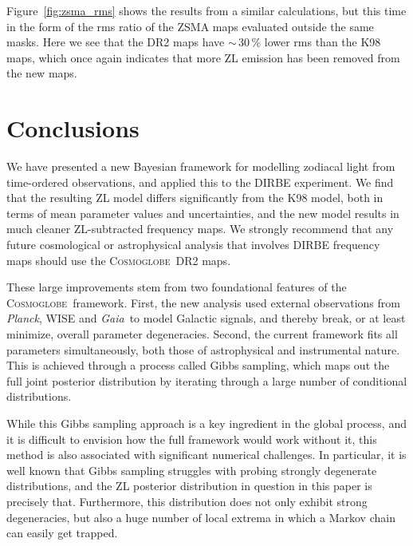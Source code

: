 \documentclass[twocolumn]{aa}
\def\Planck{\textit{Planck}}
\def\GAIA{\textit{Gaia}}
\newcommand{\cosmoglobe}{\textsc{Cosmoglobe}}
\begin{document}
Figure~\ref{fig:zsma_rms} shows the results from a similar
calculations, but this time in the form of the rms ratio of the ZSMA
maps evaluated outside the same masks. Here we see that the DR2 maps
have $\sim$\,30\,\% lower rms than the K98 maps, which once
again indicates that more ZL emission has been removed from the
new maps.









\section{Conclusions}
\label{sec:conclusions}

We have presented a new Bayesian framework for modelling zodiacal
light from time-ordered observations, and applied this to the
DIRBE experiment. We find that the resulting ZL model differs
significantly from the K98 model, both in terms of mean parameter
values and uncertainties, and the new model results in much cleaner
ZL-subtracted frequency maps. We strongly recommend that any future
cosmological or astrophysical analysis that involves DIRBE frequency
maps should use the \cosmoglobe\ DR2 maps.

These large improvements stem from two foundational features of the
\cosmoglobe\ framework. First, the new analysis used external
observations from \Planck, WISE and \GAIA\ to model Galactic signals,
and thereby break, or at least minimize, overall parameter
degeneracies. Second, the current framework fits all parameters
simultaneously, both those of astrophysical and instrumental
nature. This is achieved through a process called Gibbs sampling,
which maps out the full joint posterior distribution by iterating
through a large number of conditional distributions.

While this Gibbs sampling approach is a key ingredient in the global
process, and it is difficult to envision how the full framework would
work without it, this method is also associated with significant
numerical challenges. In particular, it is well known that Gibbs
sampling struggles with probing strongly degenerate distributions, and
the ZL posterior distribution in question in this paper is precisely
that. Furthermore, this distribution does not only exhibit strong
degeneracies, but also a huge number of local extrema in which a
Markov chain can easily get trapped.
\end{document}
